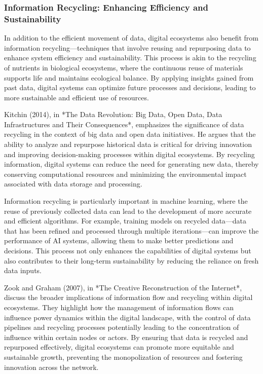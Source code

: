 \documentclass[12pt,twoside]{article}
\begin{document}
\subsubsection{Information Recycling: Enhancing Efficiency and Sustainability}

In addition to the efficient movement of data, digital ecosystems also benefit from information recycling—techniques that involve reusing and repurposing data to enhance system efficiency and sustainability. This process is akin to the recycling of nutrients in biological ecosystems, where the continuous reuse of materials supports life and maintains ecological balance. By applying insights gained from past data, digital systems can optimize future processes and decisions, leading to more sustainable and efficient use of resources.

Kitchin (2014), in *The Data Revolution: Big Data, Open Data, Data Infrastructures and Their Consequences*, emphasizes the significance of data recycling in the context of big data and open data initiatives. He argues that the ability to analyze and repurpose historical data is critical for driving innovation and improving decision-making processes within digital ecosystems. By recycling information, digital systems can reduce the need for generating new data, thereby conserving computational resources and minimizing the environmental impact associated with data storage and processing.

Information recycling is particularly important in machine learning, where the reuse of previously collected data can lead to the development of more accurate and efficient algorithms. For example, training models on recycled data—data that has been refined and processed through multiple iterations—can improve the performance of AI systems, allowing them to make better predictions and decisions. This process not only enhances the capabilities of digital systems but also contributes to their long-term sustainability by reducing the reliance on fresh data inputs.

Zook and Graham (2007), in *The Creative Reconstruction of the Internet*, discuss the broader implications of information flow and recycling within digital ecosystems. They highlight how the management of information flows can influence power dynamics within the digital landscape, with the control of data pipelines and recycling processes potentially leading to the concentration of influence within certain nodes or actors. By ensuring that data is recycled and repurposed effectively, digital ecosystems can promote more equitable and sustainable growth, preventing the monopolization of resources and fostering innovation across the network.
\end{document}
